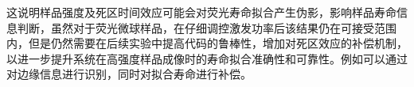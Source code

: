 这说明样品强度及死区时间效应可能会对荧光寿命拟合产生伪影，影响样品寿命信息判断，虽然对于荧光微球样品，在仔细调控激发功率后该结果仍在可接受范围内，但是仍然需要在后续实验中提高代码的鲁棒性，增加对死区效应的补偿机制，以进一步提升系统在高强度样品成像时的寿命拟合准确性和可靠性。例如可以通过对边缘信息进行识别，同时对拟合寿命进行补偿。




